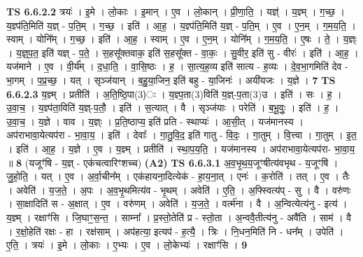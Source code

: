 \documentclass[17pt]{extarticle}
\begin{document}
                  \newline
                                \textbf{ TS 6.6.2.2} \newline
                  त्रयः॑ । इ॒मे । लो॒काः । इ॒मान् । ए॒व । लो॒कान् । प्री॒णा॒ति॒ । यज्ञ्॑ । य॒ज्ञ्म् । ग॒च्छ॒ । य॒ज्ञ्प॑ति॒मिति॑ य॒ज्ञ् - प॒ति॒म् । ग॒च्छ॒ । इति॑ । आ॒ह॒ । य॒ज्ञ्प॑ति॒मिति॑ य॒ज्ञ् - प॒ति॒म् । ए॒व । ए॒न॒म् । ग॒म॒य॒ति॒ । स्वाम् । योनि᳚म् । ग॒च्छ॒ । इति॑ । आ॒ह॒ । स्वाम् । ए॒व । ए॒न॒म् । योनि᳚म् । ग॒म॒य॒ति॒ । ए॒षः । ते॒ । य॒ज्ञ्ः । य॒ज्ञ्॒प॒त॒ इति॑ यज्ञ् - प॒ते॒ । स॒हसू᳚क्तवाक॒ इति॑ स॒हसू᳚क्त - वा॒कः॒ । सु॒वीर॒ इति॑ सु - वीरः॑ । इति॑ । आ॒ह॒ । यज॑माने । ए॒व । वी॒र्य᳚म् । द॒धा॒ति॒ । वा॒सि॒ष्ठः । ह॒ । सा॒त्य॒ह॒व्य इति॑ सात्य - ह॒व्यः । दे॒व॒भा॒गमिति॑ देव - भा॒गम् । प॒प्र॒च्छ॒ । यत् । सृञ्ज॑यान् । ब॒हु॒या॒जिन॒ इति॑ बहु - या॒जिनः॑ । अयी॑यजः । य॒ज्ञे । \textbf{  7} \newline
                  \newline
                                \textbf{ TS 6.6.2.3} \newline
                  य॒ज्ञ्म् । प्रतीति॑ । अ॒ति॒ष्ठि॒पा(3)ः । य॒ज्ञ्प॒ता(3)विति॑ य॒ज्ञ्-प॒ता(3)उ । इति॑ । सः । ह॒ । उ॒वा॒च॒ । य॒ज्ञ्प॑ता॒विति॑ य॒ज्ञ्-प॒तौ॒ । इति॑ । स॒त्यात् । वै । सृञ्ज॑याः । परेति॑ । ब॒भू॒वुः॒ । इति॑ । ह॒ । उ॒वा॒च॒ । य॒ज्ञे । वाव । य॒ज्ञ्ः । प्र॒ति॒ष्ठाप्य॒ इति॑ प्रति - स्थाप्यः॑ । आ॒सी॒त् । यज॑मानस्य । अप॑राभावा॒येत्यप॑रा - भा॒वा॒य॒ । इति॑ । देवाः᳚ । गा॒तु॒वि॒द॒ इति॑ गातु - वि॒दः॒ । गा॒तुम् । वि॒त्त्वा । गा॒तुम् । इ॒त॒ । इति॑ । आ॒ह॒ । य॒ज्ञे । ए॒व । य॒ज्ञ्म् । प्रतीति॑ । स्था॒प॒य॒ति॒ । यज॑मानस्य । अप॑राभावा॒येत्यप॑रा- भा॒वा॒य॒ ॥ \textbf{  8} \newline
                  \newline
                      (यजूꣳ॑षि - य॒ज्ञ् - एक॑चत्वारिꣳशच्च)  \textbf{(A2)} \newline \newline
                                \textbf{ TS 6.6.3.1} \newline
                  अ॒व॒भृ॒थ॒य॒जूꣳषीत्य॑वभृथ - य॒जूꣳषि॑ । जु॒हो॒ति॒ । यत् । ए॒व । अ॒र्वा॒चीन᳚म् । एक॑हायना॒दित्येक॑ - हा॒य॒ना॒त् । एनः॑ । क॒रोति॑ । तत् । ए॒व । तैः । अवेति॑ । य॒ज॒ते॒ । अ॒पः । अ॒व॒भृ॒थमित्य॑व - भृ॒थम् । अवेति॑ । ए॒ति॒ । अ॒फ्स्वित्य॑प् - सु । वै । वरु॑णः । सा॒क्षादिति॑ स - अ॒क्षात् । ए॒व । वरु॑णम् । अवेति॑ । य॒ज॒ते॒ । वर्त्म॑ना । वै । अ॒न्वित्येत्य॑नु - इत्य॑ । य॒ज्ञ्म् । रक्षाꣳ॑सि । जि॒घाꣳ॒॒स॒न्त॒ । साम्ना᳚ । प्र॒स्तो॒तेति॑ प्र - स्तो॒ता । अ॒न्ववै॒तीत्य॑नु - अवै॑ति । साम॑ । वै । र॒क्षो॒हेति॑ रक्षः - हा । रक्ष॑साम् । अप॑हत्या॒ इत्यप॑ - ह॒त्यै॒ । त्रिः । नि॒धन॒मिति॑ नि - धन᳚म् । उपेति॑ । ए॒ति॒ । त्रयः॑ । इ॒मे । लो॒काः । ए॒भ्यः । ए॒व । लो॒केभ्यः॑ । रक्षाꣳ॑सि । \textbf{  9} \newline
\end{document}
